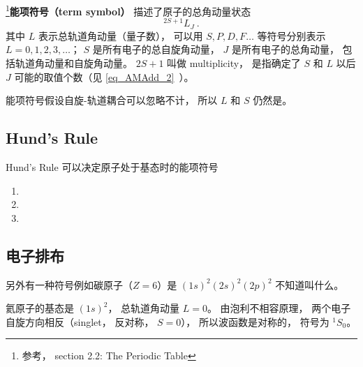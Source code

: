 
\begin{issues}
\issueDraft
\end{issues}


\footnote{参考\cite{GriffQ}， section 2.2: The Periodic Table}\textbf{能项符号（term symbol）} 描述了原子的总角动量状态
\begin{equation}
^{2S + 1} L_J~.
\end{equation}
其中 $L$ 表示总轨道角动量（量子数）， 可以用 $S, P, D, F \dots$ 等符号分别表示 $L = 0, 1, 2, 3, \dots$； $S$ 是所有电子的总自旋角动量， $J$ 是所有电子的总角动量， 包括轨道角动量和自旋角动量。 $2S + 1$ 叫做 multiplicity， 是指确定了 $S$ 和 $L$ 以后 $J$ 可能的取值个数（见 \autoref{eq_AMAdd_2}~）。

能项符号假设自旋-轨道耦合可以忽略不计， 所以 $L$ 和 $S$ 仍然是。

\subsection{Hund's Rule}
Hund's Rule 可以决定原子处于基态时的能项符号
\begin{enumerate}
\item 
\item 
\item 
\end{enumerate}

\subsection{电子排布}
另外有一种符号例如碳原子（$Z = 6$）是 $(1s)^2 (2s)^2 (2p)^2$ 不知道叫什么。

氦原子的基态是 $(1s)^2$， 总轨道角动量 $L = 0$。 由泡利不相容原理， 两个电子自旋方向相反（singlet， 反对称， $S = 0$）， 所以波函数是对称的， 符号为 $^1 S_0$。
